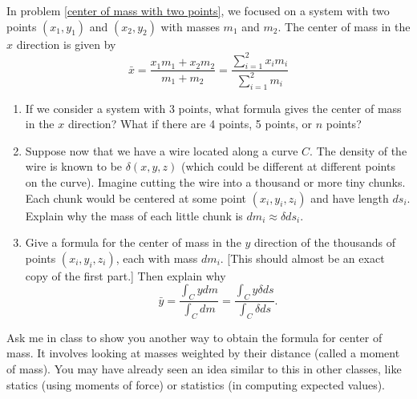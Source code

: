 \begin{problem}\label{center of mass of curve}%
%
In problem \ref{center of mass with two points}, we focused on a system with two points $(x_1,y_1)$ and $(x_2,y_2)$ with masses $m_1$ and $m_2$. The center of mass in the $x$ direction is given by  
$$
\bar x = \frac{x_1m_1+x_2m_2}{m_1+m_2} = \frac{\sum_{i=1}^2x_i m_i}{\sum_{i=1}^2m_i}$$
\begin{enumerate}
\item If we consider a system with 3 points, what formula gives the center of mass in the $x$ direction? What if there are 4 points, 5 points, or $n$ points?  
 \item Suppose now that we have a wire located along a curve $C$. The density of the wire is known to be $\delta(x,y,z)$ (which could be different at different points on the curve).  Imagine cutting the wire into a thousand or more tiny chunks.  Each chunk would be centered at some point $(x_i,y_i,z_i)$ and have length $ds_i$. Explain why the mass of each little chunk is $dm_i\approx\delta ds_i$. 
 \item Give a formula for the center of mass in the $y$ direction of the thousands of points $(x_i,y_i,z_i)$, each with mass $dm_i$. [This should almost be an exact copy of the first part.] 
 Then explain why $$\bar y = \frac{\int_C y dm}{\int_C dm}=\frac{\int_C y \delta ds}{\int_C \delta ds}.$$
\end{enumerate}
\end{problem}

Ask me in class to show you another way to obtain the formula for center of mass. It involves looking at masses weighted by their distance (called a moment of mass).  You may have already seen an idea similar to this in other classes, like statics (using moments of force) or statistics (in computing expected values).


